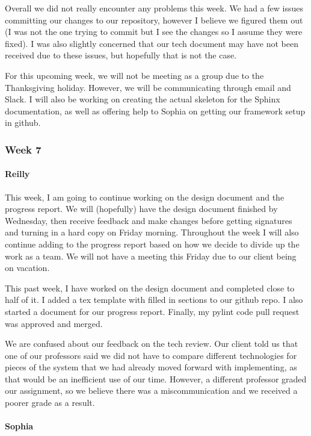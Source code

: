 \documentclass[onecolumn, draftclsnofoot,10pt, compsoc]{IEEEtran}
\begin{document}
\begin{flushleft}
 
Overall we did not really encounter any problems this week. We had a few issues committing our changes to our repository, however I believe we figured them out (I was not the one trying to commit but I see the changes so I assume they were fixed). I was also slightly concerned that our tech document may have not been received due to these issues, but hopefully that is not the case.
 
 
For this upcoming week, we will not be meeting as a group due to the Thanksgiving holiday. However, we will be communicating through email and Slack. I will also be working on creating the actual skeleton for the Sphinx documentation, as well as offering help to Sophia on getting our framework setup in github.
 
\subsubsection{Week 7}
\paragraph{Reilly}
 
This week, I am going to continue working on the design document and the progress report. We will (hopefully) have the design document finished by Wednesday, then receive feedback and make changes before getting signatures and turning in a hard copy on Friday morning. Throughout the week I will also continue adding to the progress report based on how we decide to divide up the work as a team. We will not have a meeting this Friday due to our client being on vacation.
 
 
This past week, I have worked on the design document and completed close to half of it. I added a tex template with filled in sections to our github repo. I also started a document for our progress report. Finally, my pylint code pull request was approved and merged.
 
 
We are confused about our feedback on the tech review. Our client told us that one of our professors said we did not have to compare different technologies for pieces of the system that we had already moved forward with implementing, as that would be an inefficient use of our time. However, a different professor graded our assignment, so we believe there was a miscommunication and we received a poorer grade as a result.
 
\paragraph{Sophia}
 

\end{flushleft}
\end{document}
